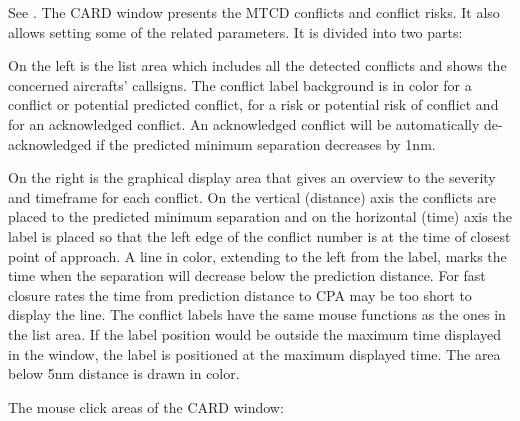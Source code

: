 \documentclass[a4paper,oneside,11pt]{memoir}
\begin{document}

See . The CARD window presents the MTCD conflicts and conflict risks. It also allows setting some of the related parameters. It is divided into two parts:

\bigskip

On the left is the list area which includes all the detected conflicts and shows the concerned aircrafts’ callsigns. The conflict label background is in  color for a conflict or potential predicted conflict,  for a risk or potential risk of conflict and  for an acknowledged conflict. An acknowledged conflict will be automatically de-acknowledged if the predicted minimum separation decreases by 1nm.

\bigskip

On the right is the graphical display area that gives an overview to the severity and timeframe for each conflict. On the vertical (distance) axis the conflicts are placed to the predicted minimum separation and on the horizontal (time) axis the label is placed so that the left edge of the conflict number is at the time of closest point of approach. A line in  color, extending to the left from the label, marks the time when the separation will decrease below the prediction distance. For fast closure rates the time from prediction distance to CPA may be too short to display the line. The conflict labels have the same mouse functions as the ones in the list area. If the label position would be outside the maximum time displayed in the window, the label is positioned at the maximum displayed time. The area below 5nm distance is drawn in  color.

\bigskip

The mouse click areas of the CARD window:
\end{document}
